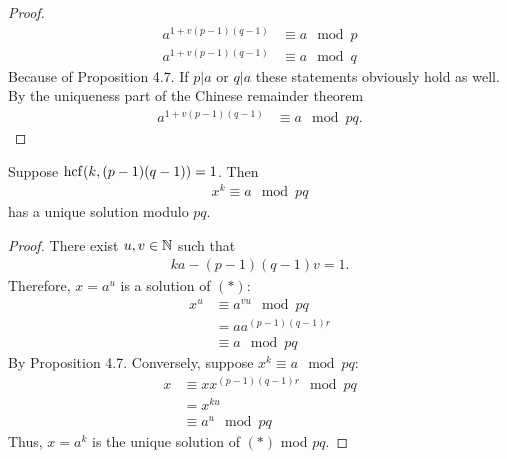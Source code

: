 \begin{proof}
	\begin{align*}
	a^{1+v(p-1)(q-1)} & \equiv a \mod p \\
	a^{1+v(p-1)(q-1)} & \equiv a \mod q
	\end{align*}
	Because of Proposition 4.7. If $p |a$ or $q|a$ these statements obviously hold as well. By the uniqueness part of the Chinese remainder theorem 
	\begin{align*}
	a^{1+v(p-1)(q-1)} & \equiv a \mod pq.
	\end{align*}
\end{proof}

\begin{pp}
	Suppose $\operatorname{hcf}(k,(p-1)(q-1)) = 1$. Then
	\begin{align*}
	x^k \equiv a \mod pq \tag{$*$}
	\end{align*}
	has a unique solution modulo $pq$.
\end{pp}

\begin{proof}
	There exist $u,v \in \mathbb N$ such that
	\begin{align*}
	ka-(p-1)(q-1) v = 1.
	\end{align*}
	Therefore, $x=a^u$ is a solution of $(*)$:
	\begin{align*}
	x^u & \equiv a^{vu}  \mod pq\\
	& = a a^{(p-1)(q-1) r} \\
	& \equiv a \mod pq 
	\end{align*}
	By Proposition 4.7. Conversely, suppose $x^k \equiv a \mod pq$:
	\begin{align*}
	x & \equiv x x^{(p-1)(q-1)r} \mod pq \\
	& = x^{ku} \\
	& \equiv a^u \mod pq
	\end{align*}
	Thus, $x=a^k$ is the unique solution of $(*)$ mod $pq$.
\end{proof}


